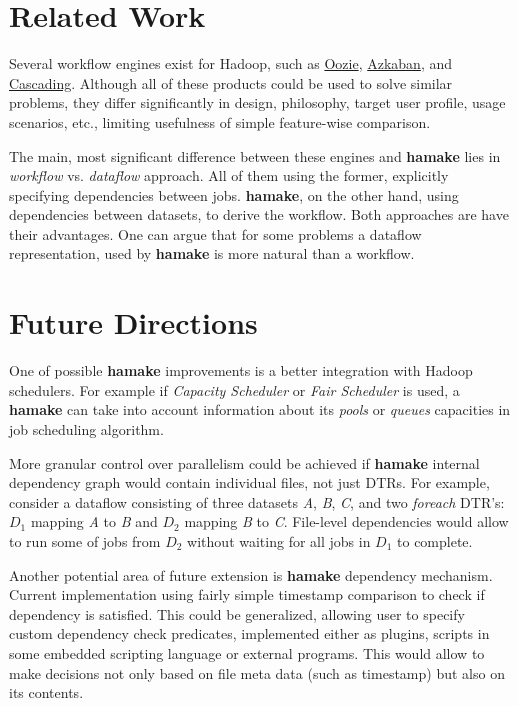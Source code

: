 \documentclass[10pt,conference,letterpaper]{IEEEtran}
\begin{document}
\section{Related Work}

Several workflow engines exist for Hadoop, such as
\href{http://github.com/tucu00/oozie1}{Oozie},
\href{http://sna-projects.com/azkaban/}{Azkaban}, and
\href{http://www.cascading.org/}{Cascading}.  Although all of these
products could be used to solve similar problems, they differ
significantly in design, philosophy, target user profile, usage
scenarios, etc., limiting usefulness of simple feature-wise
comparison.

The main, most significant difference between these engines and \textbf{hamake}
lies in \textit{workflow} vs. \textit{dataflow} approach. All of them
using the former, explicitly specifying dependencies between
jobs. \textbf{hamake}, on the other hand, using dependencies between datasets,
to derive the workflow. Both approaches are have their advantages. One
can argue that for some problems a dataflow representation, used by
\textbf{hamake} is more natural than a workflow.

\section{Future Directions}

One of possible \textbf{hamake} improvements is a better integration with
Hadoop schedulers. For example if \textit{Capacity Scheduler} or
\textit{Fair Scheduler} is used, a \textbf{hamake} can take into account
information about its \textit{pools} or \textit{queues} capacities in
job scheduling algorithm.

More granular control over parallelism could be achieved if
\textbf{hamake} internal dependency graph would contain individual
files, not just DTRs. For example, consider a dataflow consisting of
three datasets \textit{A}, \textit{B}, \textit{C}, and two
\emph{foreach} DTR's: \textit{$D_1$} mapping \textit{A} to \textit{B}
and \textit{$D_2$} mapping \textit{B} to \textit{C}. File-level
dependencies would allow to run some of jobs from \textit{$D_2$}
without waiting for all jobs in \textit{$D_1$} to complete.

Another potential area of future extension is \textbf{hamake} dependency
mechanism. Current implementation using fairly simple timestamp
comparison to check if dependency is satisfied. This could be
generalized, allowing user to specify custom dependency check
predicates, implemented either as plugins, scripts in some embedded
scripting language or external programs. This would allow to make
decisions not only based on file meta data (such as timestamp) but
also on its contents.
\end{document}
